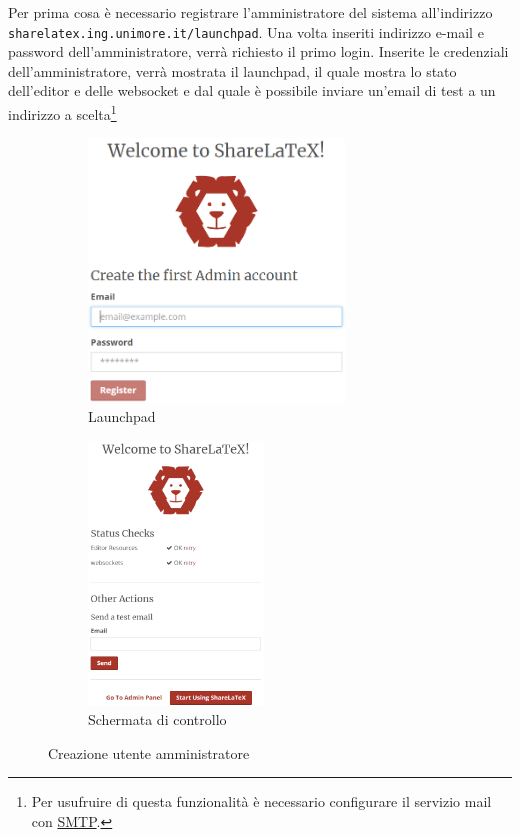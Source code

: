 Per prima cosa è necessario registrare l'amministratore del sistema all'indirizzo\\\verb|sharelatex.ing.unimore.it/launchpad|. Una volta inseriti indirizzo e-mail e password dell'amministratore, verrà richiesto il primo login. Inserite le credenziali dell'amministratore, verrà mostrata il launchpad, il quale mostra lo stato dell'editor e delle websocket e dal quale è possibile inviare un'email di test a un indirizzo a scelta\footnote{Per usufruire di questa funzionalità è necessario configurare il servizio mail con \hyperref[SMTP]{SMTP}.}
\begin{figure}[h]
    \begin{subfigure}{0.5\textwidth}
        \centering
        \includegraphics[height=7cm]{immagini/launchpad_1.png}
        \caption{Launchpad}
        \label{fig:sharelatex_launchpad_1}
    \end{subfigure}
    \begin{subfigure}{0.5\textwidth}
        \centering
        \includegraphics[height=7cm]{immagini/launchpad_2.png}
        \caption{Schermata di controllo}
        \label{fig:sharelatex_launchpad_2}
    \end{subfigure}
    \caption{Creazione utente amministratore}
    \label{fig:sharelatex_launchpad}
\end{figure}


